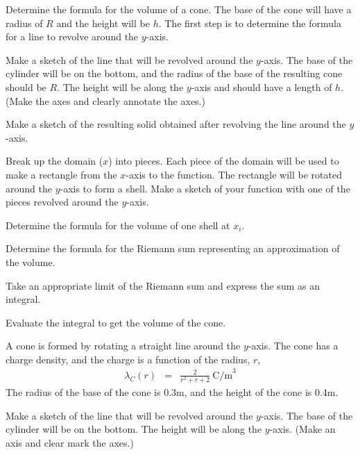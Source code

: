 \begin{problem}
  \item Determine the formula for the volume of a cone.
      The base of the cone will have a radius of $R$ and the height will be $h$.
      The first step is to determine the formula for a line to revolve around the $y$-axis.
    \begin{subproblem}
      \item
        Make a sketch of the line that will be revolved around the $y$-axis.
        The base of the cylinder will be on the bottom, and the radius of the base of the resulting cone should be $R$.
        The height will be along the $y$-axis and should have a length of $h$.
        (Make the axes and clearly annotate the axes.)
        \vfill

      \item Make a sketch of the resulting solid obtained after
        revolving the line around the $y$-axis.
        \vfill

      \item Break up the domain ($x$) into pieces. Each piece of the domain will be used to make a rectangle
           from the $x$-axis to the function. The rectangle will be rotated around the $y$-axis to form a shell.
           Make a sketch of your function with one of the pieces revolved around the $y$-axis.
        \vfill

      \clearpage

      \item Determine the formula for the volume of one shell at $x_i$.
        \vfill

      \item Determine the formula for the Riemann sum representing an approximation of the volume.
        \vfill

      \item Take an appropriate limit of the Riemann sum and express the sum as an integral.
        \vfill

      \item Evaluate the integral to get the volume of the cone.
        \vfill

    \end{subproblem}

    \clearpage

    \item A cone is formed by rotating a straight line around the $y$-axis.
       The cone has a charge density, and the charge is a function of the radius, $r$,
       \begin{eqnarray*}
         \lambda_C(r) & = & \frac{2}{r^2+r+2} ~ \mathrm{C/m}^3
       \end{eqnarray*}
       The radius of the base of the cone is 0.3m, and the height of the cone is 0.4m.
       \begin{subproblem}
         \item
           Make a sketch of the line that will be revolved around the $y$-axis.
           The base of the cylinder will be on the bottom.
           The height will be along the $y$-axis.
           (Make an axis and clear mark the axes.)
           \vfill


\end{subproblem}
\end{problem}
